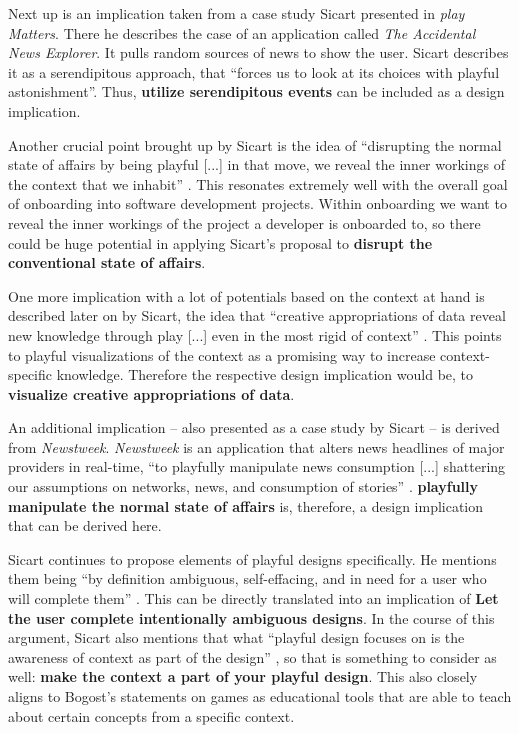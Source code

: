 Next up is an implication taken from a case study Sicart presented in \textit{play Matters}. There he describes the case of an application called \textit{The Accidental News Explorer}. It pulls random sources of news to show the user. Sicart describes it as a serendipitous approach, that \enquote{forces us to look at its choices with playful astonishment}. Thus, \textbf{utilize serendipitous events} can be included as a design implication.

Another crucial point brought up by Sicart is the idea of \enquote{disrupting the normal state of affairs by being playful [...] in that move, we reveal the inner workings of the context that we inhabit} \cite[p. 15]{sicart2014play}. This resonates extremely well with the overall goal of onboarding into software development projects. Within onboarding we want to reveal the inner workings of the project a developer is onboarded to, so there could be huge potential in applying Sicart's proposal to \textbf{disrupt the conventional state of affairs}.

One more implication with a lot of potentials based on the context at hand is described later on by Sicart, the idea that \enquote{creative appropriations of data reveal new knowledge through play [...] even in the most rigid of context} \cite[p. 28]{sicart2014play}. This points to playful visualizations of the context as a promising way to increase context-specific knowledge. Therefore the respective design implication would be, to \textbf{visualize creative appropriations of data}.

An additional implication -- also presented as a case study by Sicart -- is derived from \textit{Newstweek}. \textit{Newstweek} is an application that alters news headlines of major providers in real-time, \enquote{to playfully manipulate news consumption [...] shattering our assumptions on networks, news, and consumption of stories} \cite[p. 29]{sicart2014play}. \textbf{playfully manipulate the normal state of affairs} is, therefore, a design implication that can be derived here.

Sicart continues to propose elements of playful designs specifically. He mentions them being \enquote{by definition ambiguous, self-effacing, and in need for a user who will complete them} \cite[p. 31]{sicart2014play}. This can be directly translated into an implication of \textbf{Let the user complete intentionally ambiguous designs}. In the course of this argument, Sicart also mentions that what \enquote{playful design focuses on is the awareness of context as part of the design} \cite[p. 29]{sicart2014play}, so that is something to consider as well: \textbf{make the context a part of your playful design}. This also closely aligns to Bogost's statements on games as educational tools that are able to teach about certain concepts from a specific context.

